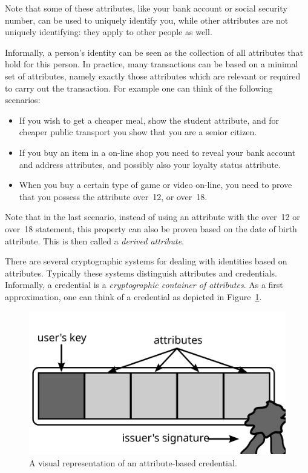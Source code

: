 Note that some of these attributes, like your bank account or social security
number, can be used to uniquely identify you, while other attributes are not
uniquely identifying: they apply to other people as well.

Informally, a person's identity can be seen as the collection
of all attributes that hold for this person. In practice, many transactions can
be based on a minimal set of attributes, namely exactly those attributes which
are relevant or required to carry out the transaction. For example one can think
of the following scenarios:
\begin{itemize}
  \item If you wish to get a cheaper meal, show the \textsf{student} attribute,
    and for cheaper public transport you show that you are a \textsf{senior
    citizen}.
  \item If you buy an item in a on-line shop you need to reveal your
    \textsf{bank account} and \textsf{address} attributes, and possibly also
    your \textsf{loyalty status} attribute.
  \item When you buy a certain type of game or video on-line, you need to
    prove that you possess the attribute \textsf{over~12}, or \textsf{over~18}.
\end{itemize}
Note that in the last scenario, instead of using an attribute with the
\textsf{over~12} or \textsf{over~18} statement, this property can also be
proven based on the \textsf{date of birth} attribute. This is then called a
\emph{derived attribute}.

There are several cryptographic systems for dealing with identities based on
attributes. Typically these systems distinguish attributes and credentials.
Informally, a credential is a \emph{cryptographic container
 of attributes}. As a first approximation, one
can think of a credential as depicted in Figure~\ref{fig:Credential}.

\begin{figure}[ht]
  \centering
  \includegraphics[scale=.5]{images/credential}
  \caption{A visual representation of an attribute-based credential.}
  \label{fig:Credential}
\end{figure}

